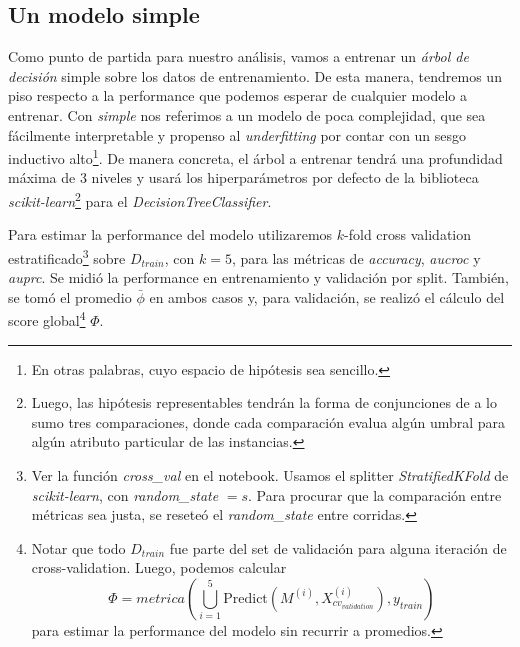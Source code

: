 
\subsection{Un modelo simple}\label{simple}

Como punto de partida para nuestro análisis, vamos a entrenar un \textit{árbol de decisión} simple sobre los datos de entrenamiento. De esta manera, tendremos un piso respecto a la performance que podemos esperar de cualquier modelo a entrenar. Con \textit{simple} nos referimos a un modelo de poca complejidad, que sea fácilmente interpretable y propenso al \textit{underfitting} por contar con un sesgo inductivo alto\footnote{En otras palabras, cuyo espacio de hipótesis sea sencillo.}. De manera concreta, el árbol a entrenar tendrá una profundidad máxima de $3$ niveles y usará los hiperparámetros por defecto de la biblioteca \textit{scikit-learn}\footnote{Luego, las hipótesis representables tendrán la forma de conjunciones de a lo sumo tres comparaciones, donde cada comparación evalua algún umbral para algún atributo particular de las instancias.} para el \textit{DecisionTreeClassifier}.

Para estimar la performance del modelo utilizaremos $k$-fold cross validation estratificado\footnote{Ver la función \textit{cross\_val} en el notebook. Usamos el splitter \textit{StratifiedKFold} de \textit{scikit-learn}, con \textit{random\_state} $= s$. Para procurar que la comparación entre métricas sea justa, se reseteó el \textit{random\_state} entre corridas.} sobre $D_{train}$, con $k=5$, para las métricas de \textit{accuracy}, \textit{aucroc} y \textit{auprc}. Se midió la performance en entrenamiento y validación por split. También, se tomó el promedio $\bar\phi$ en ambos casos y, para validación, se realizó el cálculo del score global\footnote{Notar que todo $D_{train}$ fue parte del set de validación para alguna iteración de cross-validation. Luego, podemos calcular $$\Phi = metrica(\bigcup_{i=1}^5\text{Predict}(M^{(i)}, X_{cv_{validation}}^{(i)}), y_{train})$$ para estimar la performance del modelo sin recurrir a promedios.} $\Phi$.

